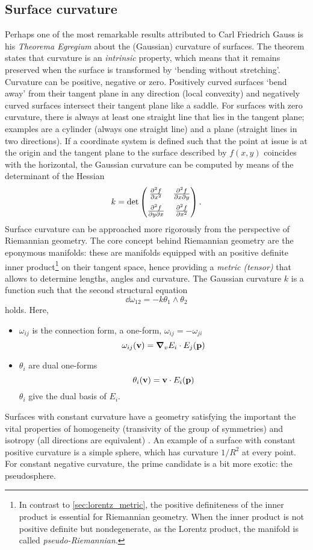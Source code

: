 \subsection{Surface curvature}
Perhaps one of the most remarkable results attributed to Carl Friedrich Gauss is his \emph{Theorema Egregium} about the (Gaussian) curvature of surfaces. The theorem states that curvature is an \emph{intrinsic} property, which means that it remains preserved when the surface is transformed by `bending without stretching'. Curvature can be positive, negative or zero. Positively curved surfaces `bend away' from their tangent plane in any direction (local convexity) and negatively curved surfaces intersect their tangent plane like a saddle. For surfaces with zero curvature, there is always at least one straight line that lies in the tangent plane; examples are a cylinder (always one straight line) and a plane (straight lines in two directions). If a coordinate system is defined such that the point at issue is at the origin and the tangent plane to the surface described by $f(x, y)$ coincides with the horizontal, the Gaussian curvature can be computed by means of the determinant of the Hessian \cite{Thurston1997, ONeill2006}
    \[ 
        k = \det \begin{pmatrix}
                \pdv[2]{f}{x} & \pdv{f}{x}{y}\\[6pt]
                \pdv{f}{y}{x} & \pdv[2]{f}{x}
        \end{pmatrix}.
    \]
Surface curvature can be approached more rigorously from the perspective of Riemannian geometry. The core concept behind Riemannian geometry are the eponymous manifolds: these are manifolds equipped with an positive definite inner product\footnote{In contrast to \cref{sec:lorentz_metric}, the positive definiteness of the inner product is essential for Riemannian geometry. When the inner product is not positive definite but nondegenerate, as the Lorentz product, the manifold is called \emph{pseudo-Riemannian}.} on their tangent space, hence providing a \emph{metric (tensor)} that allows to determine lengths, angles and curvature. The Gaussian curvature $k$ is a function such that the second structural equation
    \[
        \dd{\omega_{12}} = -k \theta_1 \wedge \theta_2
    \]
holds. Here, 
\begin{itemize}
    \item $\omega_{ij}$ is the connection form, a one-form, \(
        \omega_{ij} = - \omega_{ji}\)
        \[ 
            \omega_{ij}(\vb{v}) = \grad_v E_i \cdot E_j (\vb{p})
        \]
    \item $\theta_i$ are dual one-forms
        \[ 
            \theta_i(\vb{v}) = \vb{v}\cdot E_i(\vb{p}) 
        \]
        \(\theta_i\) give the dual basis of \(E_i\).
\end{itemize}
Surfaces with constant curvature have a geometry satisfying the important the vital properties of homogeneity (transivity of the group of symmetries) and isotropy (all directions are equivalent) \cite{Thurston1997}. An example of a surface with constant positive curvature is a simple sphere, which has curvature $1/R^2$ at every point. For constant negative curvature, the prime candidate is a bit more exotic: the pseudosphere.

